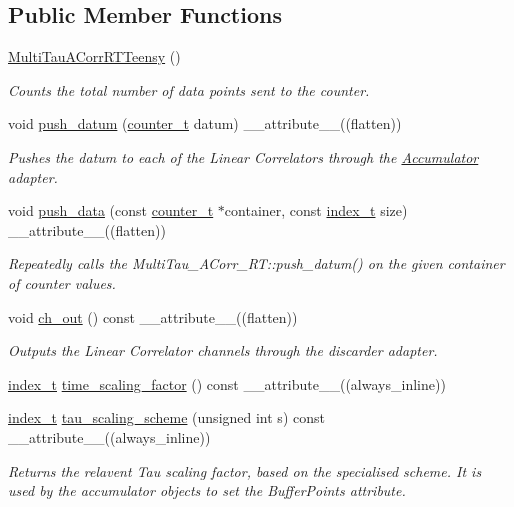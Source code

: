\subsection*{Public Member Functions}
\begin{DoxyCompactItemize}
\item 
\hyperlink{classMultiTauACorrRTTeensy_a46b73c98f07f536603a8f5b2b3174d91}{Multi\+Tau\+A\+Corr\+R\+T\+Teensy} ()
\begin{DoxyCompactList}\small\item\em Counts the total number of data points sent to the counter. \end{DoxyCompactList}\item 
void \hyperlink{classMultiTauACorrRTTeensy_a85777a221b7a15de34b252ed804ab0f8}{push\+\_\+datum} (\hyperlink{types_8hpp_a22f279793847eba127de149437848c48}{counter\+\_\+t} datum) \+\_\+\+\_\+attribute\+\_\+\+\_\+((flatten))
\begin{DoxyCompactList}\small\item\em Pushes the datum to each of the Linear Correlators through the \hyperlink{classAccumulator}{Accumulator} adapter. \end{DoxyCompactList}\item 
void \hyperlink{classMultiTauACorrRTTeensy_ad3c078b834bb1682c93ba4cd5639d450}{push\+\_\+data} (const \hyperlink{types_8hpp_a22f279793847eba127de149437848c48}{counter\+\_\+t} $\ast$container, const \hyperlink{types_8hpp_a7c40bb931c31595ed6308605f4537447}{index\+\_\+t} size) \+\_\+\+\_\+attribute\+\_\+\+\_\+((flatten))
\begin{DoxyCompactList}\small\item\em Repeatedly calls the Multi\+Tau\+\_\+\+A\+Corr\+\_\+\+R\+T\+::push\+\_\+datum() on the given container of counter values. \end{DoxyCompactList}\item 
void \hyperlink{classMultiTauACorrRTTeensy_af9ab6f055c1efc4a28c7c5bfa3aea074}{ch\+\_\+out} () const \+\_\+\+\_\+attribute\+\_\+\+\_\+((flatten))
\begin{DoxyCompactList}\small\item\em Outputs the Linear Correlator channels through the discarder adapter. \end{DoxyCompactList}\item 
\hyperlink{types_8hpp_a7c40bb931c31595ed6308605f4537447}{index\+\_\+t} \hyperlink{classMultiTauACorrRTTeensy_a56fbc9bf757ac74e0dad862ec45def82}{time\+\_\+scaling\+\_\+factor} () const \+\_\+\+\_\+attribute\+\_\+\+\_\+((always\+\_\+inline))
\item 
\hyperlink{types_8hpp_a7c40bb931c31595ed6308605f4537447}{index\+\_\+t} \hyperlink{classMultiTauACorrRTTeensy_a1a677c901b40aecdd00a4f2135d8c2bb}{tau\+\_\+scaling\+\_\+scheme} (unsigned int s) const \+\_\+\+\_\+attribute\+\_\+\+\_\+((always\+\_\+inline))
\begin{DoxyCompactList}\small\item\em Returns the relavent Tau scaling factor, based on the specialised scheme. It is used by the accumulator objects to set the Buffer\+Points attribute. \end{DoxyCompactList}\end{DoxyCompactItemize}
